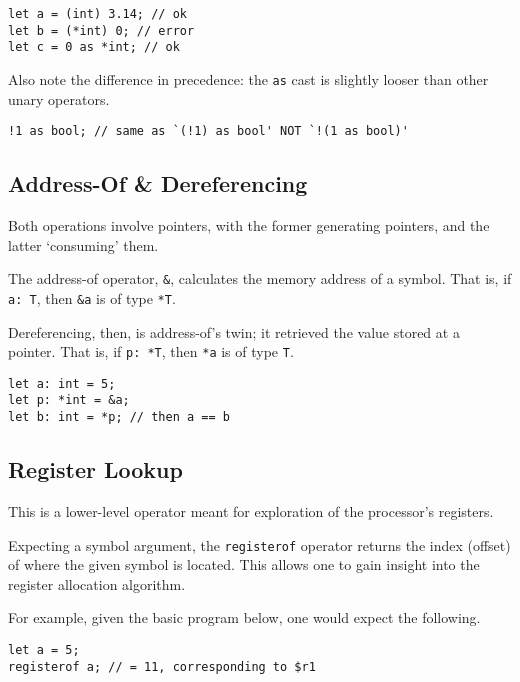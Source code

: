 \documentclass{article}
\begin{document}
    \begin{lstlisting}[language=CustomLang]
let a = (int) 3.14; // ok
let b = (*int) 0; // error
let c = 0 as *int; // ok
    \end{lstlisting}

    Also note the difference in precedence: the \texttt{as} cast is slightly looser than other unary operators.

    \begin{lstlisting}[language=CustomLang]
!1 as bool; // same as `(!1) as bool' NOT `!(1 as bool)'
    \end{lstlisting}

    \subsection{Address-Of \& Dereferencing}\label{subsec:address-of-&-dereferencing}

    Both operations involve pointers, with the former generating pointers, and the latter `consuming' them.

    The address-of operator, \texttt{\&}, calculates the memory address of a symbol.
    That is, if \texttt{a: T}, then \texttt{\&a} is of type \texttt{*T}.

    Dereferencing, then, is address-of's twin; it retrieved the value stored at a pointer.
    That is, if \texttt{p: *T}, then \texttt{*a} is of type \texttt{T}.

    \begin{lstlisting}[language=CustomLang]
let a: int = 5;
let p: *int = &a;
let b: int = *p; // then a == b
    \end{lstlisting}

    \subsection{Register Lookup}

    This is a lower-level operator meant for exploration of the processor's registers.

    Expecting a symbol argument, the \texttt{registerof} operator returns the index (offset) of where the given symbol is located.
    This allows one to gain insight into the register allocation algorithm.

    For example, given the basic program below, one would expect the following.

    \begin{lstlisting}[language=CustomLang]
let a = 5;
registerof a; // = 11, corresponding to $r1
    \end{lstlisting}
\end{document}
